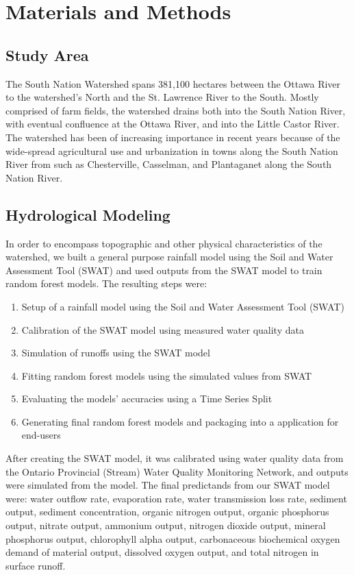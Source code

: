 \documentclass[runningheads]{llncs}
\begin{document}
\section{Materials and Methods}
\subsection{Study Area}
The South Nation Watershed spans 381,100 hectares between the Ottawa River to the watershed's North and the St. Lawrence River to the South.
Mostly comprised of farm fields, the watershed drains both into the South Nation River, with eventual confluence at the Ottawa River, and into the Little Castor River.
The watershed has been of increasing importance in recent years because of the wide-spread agricultural use and urbanization in towns along the South Nation River from such as Chesterville, Casselman, and Plantaganet along the South Nation River.

\subsection{Hydrological Modeling}
In order to encompass topographic and other physical characteristics of the watershed, we built a general purpose rainfall model using the Soil and Water Assessment Tool (SWAT) and used outputs from the SWAT model to train random forest models.
The resulting steps were:

\begin{enumerate}
	\item Setup of a rainfall model using the Soil and Water Assessment Tool (SWAT)
	\item Calibration of the SWAT model using measured water quality data
	\item Simulation of runoffs using the SWAT model
	\item Fitting random forest models using the simulated values from SWAT
	\item Evaluating the models' accuracies using a Time Series Split
	\item Generating final random forest models and packaging into a application for end-users
\end{enumerate}

After creating the SWAT model, it was calibrated using water quality data from the Ontario Provincial (Stream) Water Quality Monitoring Network, and outputs were simulated from the model.
The final predictands from our SWAT model were: water outflow rate, evaporation rate, water transmission loss rate, sediment output, sediment concentration, organic nitrogen output, organic phosphorus output, nitrate output, ammonium output, nitrogen dioxide output, mineral phosphorus output, chlorophyll alpha output, carbonaceous biochemical oxygen demand of material output, dissolved oxygen output, and total nitrogen in surface runoff.
\end{document}
